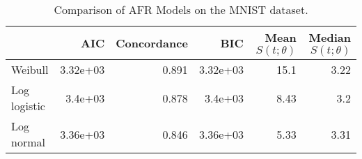 \begin{table}
\centering
\caption{Comparison of AFR Models on the MNIST dataset.}
\label{tab:mnist}
\begin{tabular}{lrrrrr}
\toprule
{} &      AIC &  Concordance &      BIC &  Mean $S(t;\theta)$ &  Median $S(t;\theta)$ \\
\midrule
Weibull      & 3.32e+03 &        0.891 & 3.32e+03 &                15.1 &                  3.22 \\
Log logistic &  3.4e+03 &        0.878 &  3.4e+03 &                8.43 &                   3.2 \\
Log normal   & 3.36e+03 &        0.846 & 3.36e+03 &                5.33 &                  3.31 \\
\bottomrule
\end{tabular}
\end{table}
